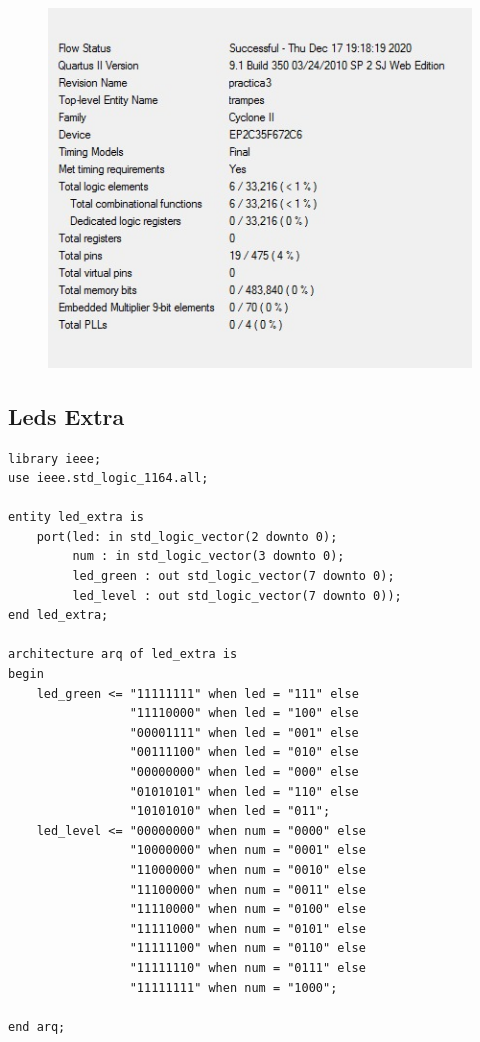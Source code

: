 \documentclass[12pt, a4papre]{article}
\begin{document}
			\begin{figure}[H]
			
				\begin{center}
		\includegraphics[width=130mm]{informeTrampes.jpeg}
		\end{center}
	\end{figure}	

			
			
\subsection{Leds Extra}

	\begin{lstlisting}[style=vhdl, frame=single, basicstyle=\tiny]
	library ieee;
use ieee.std_logic_1164.all;

entity led_extra is
	port(led: in std_logic_vector(2 downto 0);
		 num : in std_logic_vector(3 downto 0);
		 led_green : out std_logic_vector(7 downto 0);
		 led_level : out std_logic_vector(7 downto 0));
end led_extra;

architecture arq of led_extra is
begin
	led_green <= "11111111" when led = "111" else
				 "11110000" when led = "100" else
				 "00001111" when led = "001" else
				 "00111100" when led = "010" else
				 "00000000" when led = "000" else
				 "01010101" when led = "110" else
				 "10101010" when led = "011";
	led_level <= "00000000" when num = "0000" else
				 "10000000" when num = "0001" else
				 "11000000" when num = "0010" else
				 "11100000" when num = "0011" else
				 "11110000" when num = "0100" else
				 "11111000" when num = "0101" else
				 "11111100" when num = "0110" else
				 "11111110" when num = "0111" else
				 "11111111" when num = "1000";
				 
end arq;
	\end{lstlisting}
	
\end{document}
